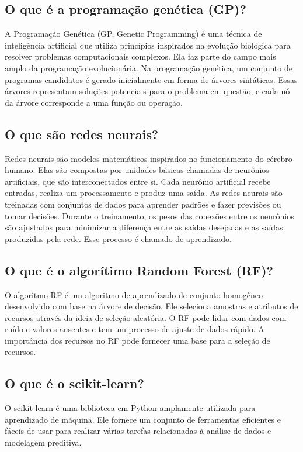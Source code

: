 \documentclass[conference]{IEEEtran}
\begin{document}
\subsection{O que é a programação genética (GP)?}
A Programação Genética (GP, Genetic Programming) é uma técnica de inteligência artificial que utiliza princípios inspirados na evolução biológica para resolver problemas computacionais complexos. Ela faz parte do campo mais amplo da programação evolucionária.
Na programação genética, um conjunto de programas candidatos é gerado inicialmente em forma de árvores sintáticas. Essas árvores representam soluções potenciais para o problema em questão, e cada nó da árvore corresponde a uma função ou operação.

\subsection{O que são redes neurais?}
Redes neurais são modelos matemáticos inspirados no funcionamento do cérebro humano. Elas são compostas por unidades básicas chamadas de neurônios artificiais, que são interconectados entre si. Cada neurônio artificial recebe entradas, realiza um processamento e produz uma saída.
As redes neurais são treinadas com conjuntos de dados para aprender padrões e fazer previsões ou tomar decisões. Durante o treinamento, os pesos das conexões entre os neurônios são ajustados para minimizar a diferença entre as saídas desejadas e as saídas produzidas pela rede. Esse processo é chamado de aprendizado.

\subsection{O que é o algorítimo Random Forest (RF)?}
O algoritmo RF é um algoritmo de aprendizado de conjunto homogêneo desenvolvido com base na árvore de decisão. Ele seleciona amostras e atributos de recursos através da ideia de seleção aleatória. O RF pode lidar com dados com ruído e valores ausentes e tem um processo de ajuste de dados rápido. A importância dos recursos no RF pode fornecer uma base para a seleção de recursos.

\subsection{O que é o scikit-learn?}
O scikit-learn é uma biblioteca em Python amplamente utilizada para aprendizado de máquina. Ele fornece um conjunto de ferramentas eficientes e fáceis de usar para realizar várias tarefas relacionadas à análise de dados e modelagem preditiva.
\end{document}

